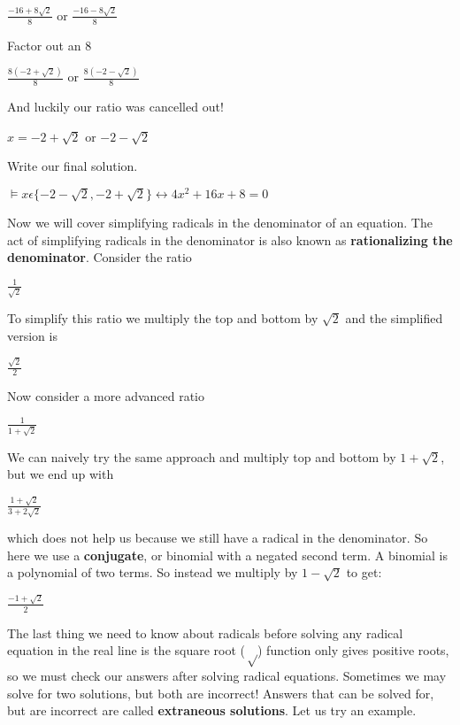 \documentclass{book}
\theoremstyle{definition}
\begin{document}
\begin{center}           
    $\frac{-16+8\sqrt{2}}{8}$ or $\frac{-16-8\sqrt{2}}{8}$
\end{center}
Factor out an $8$

\begin{center}
$\frac{8(-2+\sqrt{2})}{8}$ or $\frac{8(-2-\sqrt{2})}{8}$
\end{center}
And luckily our ratio was cancelled out!    

\begin{center}
$x=-2+\sqrt{2}$ or $-2-\sqrt{2}$
\end{center}
Write our final solution.

\begin{center}
$\models x\epsilon\{-2-\sqrt{2},-2+\sqrt{2}\} \leftrightarrow 4x^2+16x+8=0$
\end{center}

Now we will cover simplifying radicals in the denominator of an equation. The act of simplifying radicals in the denominator is also known as \textbf{rationalizing the denominator}. Consider the ratio
\begin{center}
                    $\frac{1}{\sqrt{2}}$
\end{center}
To simplify this ratio we multiply the top and bottom by $\sqrt{2}$ and the simplified version is
\begin{center}
                    $\frac{\sqrt{2}}{2}$
\end{center}
Now consider a more advanced ratio
\begin{center}
                    $\frac{1}{1+\sqrt{2}}$
\end{center}

We can naively try the same approach and multiply top and bottom by $1+\sqrt{2}$, but we end up with 
\begin{center}
                $\frac{1+\sqrt{2}}{3+2\sqrt{2}}$
\end{center}

which does not help us because we still have a radical in the denominator. So here we use a \textbf{conjugate}, or binomial with a negated second term. A binomial is a polynomial of two terms. So instead we multiply by $1-\sqrt{2}$ to get:

\begin{center}
                    $\frac{-1+\sqrt{2}}{2}$
\end{center}

The last thing we need to know about radicals before solving any radical equation in the real line is the square root ($\sqrt$) function only gives positive roots, so we must check our answers after solving radical equations. Sometimes we may solve for two solutions, but both are incorrect! Answers that can be solved for, but are incorrect are called \textbf{extraneous solutions}. Let us try an example.
\end{document}
